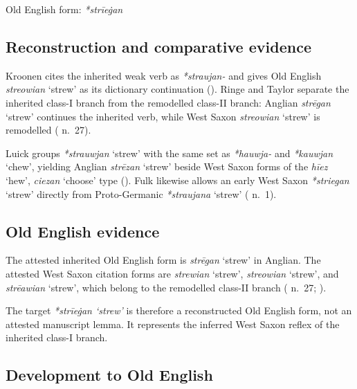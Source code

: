\documentclass[
  british,
  a4paper,
  openany]{book}
\providecommand{\Recon}[1]{\emph{*#1}}
{\catcode`→=\active \global\def→{\ensuremath{\rightarrow}}}
\providecommand{\Recon}[1]{\emph{*#1}}
{\catcode`→=\active \global\def→{\ensuremath{\rightarrow}}}
\begin{document}
Old English form: \emph{*strīeġan}

\subsection{Reconstruction and comparative
evidence}\label{reconstruction-and-comparative-evidence-138}

Kroonen cites the inherited weak verb as {\emph{*straujan-}} and gives
Old English {\emph{streowian}} `strew' as its dictionary continuation
(). Ringe and Taylor
separate the inherited class-I branch from the remodelled class-II
branch: Anglian {\emph{strēgan}} `strew' continues the inherited verb,
while West Saxon {\emph{streowian}} `strew' is remodelled
(
n.~27).

Luick groups \Recon{strauwjan} `strew' with the same set as
\emph{*hauwja-} and \Recon{kauwjan} `chew', yielding Anglian
{\emph{strēzan}} `strew' beside West Saxon forms of the {\emph{hīez}}
`hew', {\emph{ciezan}} `choose' type (). Fulk likewise allows an early West Saxon
\Recon{striegan} `strew' directly from Proto-Germanic \Recon{straujana}
`strew' ( n.~1).

\subsection{Old English evidence}\label{old-english-evidence-138}

The attested inherited Old English form is {\emph{strēgan}} `strew' in
Anglian. The attested West Saxon citation forms are {\emph{strewian}}
`strew', {\emph{streowian}} `strew', and {\emph{strēawian}} `strew',
which belong to the remodelled class-II branch
( n.~27;
).

The target {\emph{\Recon{strīeġan} `strew'}} is therefore a
reconstructed Old English form, not an attested manuscript lemma. It
represents the inferred West Saxon reflex of the inherited class-I
branch.

\subsection{Development to Old
English}\label{development-to-old-english-138}
\end{document}
